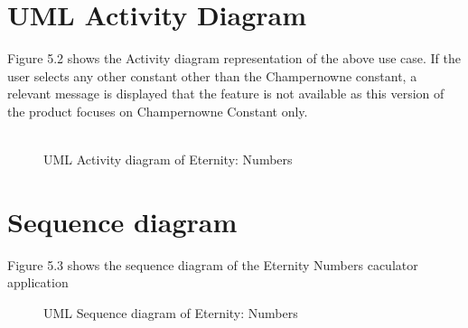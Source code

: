\documentclass[12pt, a4paper]{report}
\begin{document}
\section{UML Activity Diagram}
Figure 5.2 shows the Activity diagram representation of the above use case. If the user selects any other constant other than the Champernowne constant, a relevant message is displayed that the feature is not available as this version of the product focuses on Champernowne Constant only.\\\\
\begin{figure}[!h]
    \centering
    \caption{UML Activity diagram of Eternity: Numbers}
    \label{fig:UML Activity diagram of Eternity: Numbers}
\end{figure}

\section{Sequence diagram}
Figure 5.3 shows the sequence diagram of the Eternity Numbers caculator application
\begin{figure}[h]
    \centering
    \caption{UML Sequence diagram of Eternity: Numbers}
    \label{fig:UML Sequence diagram of Eternity: Numbers}
\end{figure}
\end{document}
